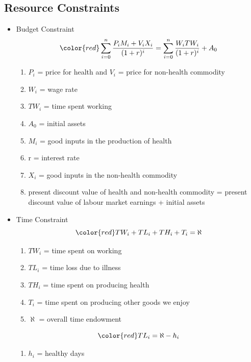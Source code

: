 \subsection{Resource Constraints}
\begin{itemize}
        \item Budget Constraint
        $$\color{red} \sum_{i=0}^n\frac{P_iM_i+V_iX_i}{(1+r)^i}=\sum_{i=0}^n\frac{W_iTW_i}{(1+r)^i}+ A_0$$
        \begin{enumerate} 
        \item $P_i$ = price for health and $V_i$ = price for non-health commodity
        \item $W_i$ = wage rate
        \item $TW_i$ = time spent working 
        \item $A_0$ = initial assets
        \item $M_i$ = good inputs in the production of health
        \item r = interest rate
        \item $X_i$ = good inputs in the non-health commodity
        \item present discount value of health and non-health commodity = present discount value of labour market earnings + initial assets
        \end{enumerate}
        \item Time Constraint
        $$\color{red} TW_i+TL_i+TH_i+T_i= \aleph $$
        \begin{enumerate}
        \item $TW_i$ = time spent on working
        \item $TL_i$ = time loss due to illness
        \item $TH_i$ = time spent on producing health
        \item $T_i$ = time spent on producing other goods we enjoy
        \item  $\aleph$  = overall time endowment
        \end{enumerate}
        $$\color{red} TL_i= \aleph - h_i $$
        \begin{enumerate}
        \item $h_i$ = healthy days
        \end{enumerate}
\end{itemize}    

